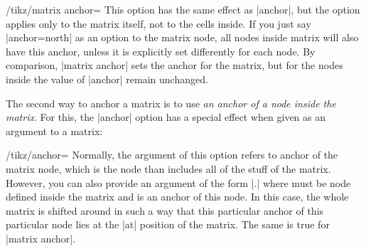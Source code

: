 \begin{key}{/tikz/matrix anchor=}
  This option has the same effect as |anchor|, but the option applies
  only to the matrix itself, not to the cells inside. If you just say
  |anchor=north| as an option to the matrix node, all nodes inside
  matrix will also have this anchor, unless it is explicitly set
  differently for each node. By comparison, |matrix anchor| sets the
  anchor for the matrix, but for the nodes inside the value of
  |anchor| remain unchanged.

\begin{codeexample}[]
\end{codeexample}
\end{key}

The second way to anchor a matrix is to use \emph{an anchor of a node
  inside the matrix}. For this, the |anchor| option has a special
effect when given as an argument to a matrix:

\begin{key}{/tikz/anchor=}
  Normally, the argument of this option refers to anchor of the matrix
  node, which is the node than includes all of the stuff of the
  matrix. However, you can also provide an argument of the form
  |.| where  must be node defined
  inside the matrix and  is an anchor of this node. In
  this case, the whole matrix is shifted around in such a way that
  this particular anchor of this particular node lies at the |at|
  position of the matrix. The same is true for |matrix anchor|.

\begin{codeexample}[]
\end{codeexample}
\end{key}


